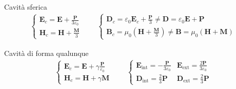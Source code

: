 \documentclass[10pt, twocolumn, a4paper, fleqn]{article}
\def\bb{\mathbf}
\def\({\left(}
\def\){\right)}
\def\e{\varepsilon}
\def\E{\bb{E}}
\def\P{\bb{P}}
\def\D{\bb{D}}
\def\B{\bb{B}}
\def\H{\bb{H}}
\def\M{\bb{M}}
\begin{document}
Cavità sferica
\begin{equation*}\begin{split}
\begin{cases}
\E_c=\E+\frac{\P}{3\e_0}\\
\H_c=\H+\frac{\M}{3}
\end{cases}
\qquad
\begin{cases}
\D_c=\e_0\E_c+\frac{\P}{3}\neq\D=\e_0\E+\P\\
\B_c=\mu_0\(\H+\frac{\M}{3}\)\neq\B=\mu_0\(\H+\M\)
\end{cases}
\end{split}\end{equation*}

Cavità di forma qualunque
\begin{equation*}\begin{split}
\begin{cases}
\E_c=\E+\gamma\frac{\P}{\e_0}\\
\H_c=\H+\gamma\M
\end{cases}
\qquad
\begin{cases}
\E_{\textrm{int}}=-\frac{\P}{3\e_0} & \E_{\textrm{ext}}=\frac{2\P}{3\e_0}\\
\D_{\textrm{int}}=\frac{2}{3}\P & \D_{\textrm{ext}}=\frac{2}{3}\P
\end{cases}
\end{split}\end{equation*}
\end{document}
